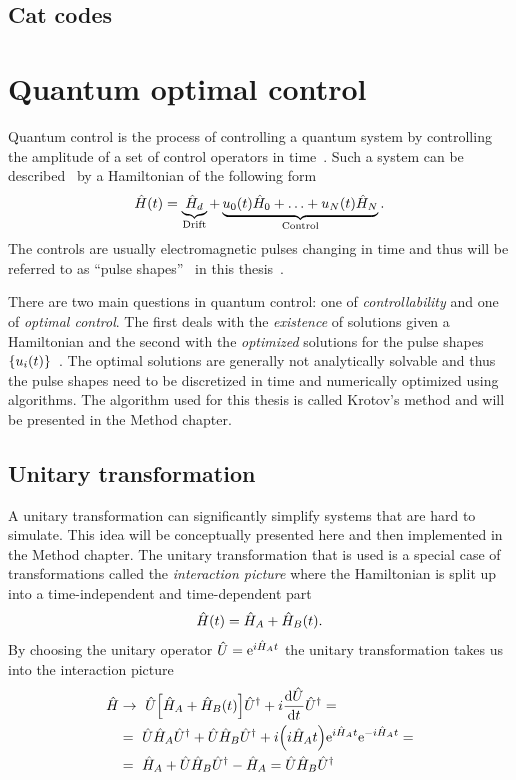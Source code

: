 \documentclass[main.tex]{subfiles}
\begin{document}
\subsection{Cat codes}


\section{Quantum optimal control}
Quantum control is the process of controlling a quantum system by controlling the amplitude of a set of control operators in time~\cite{fisher_optimal_2010}.
Such a system can be described~\cite{fisher_optimal_2010} by a Hamiltonian of the following form
\begin{equation}
    \hat{H}(t) = \underbrace{\hat{H}_d}_{\text{Drift}} + \underbrace{u_0(t)\hat{H}_0 + \dotsc + u_N(t)\hat{H}_N}_{\text{Control}}.
    \label{eq:optimal-control-hamiltonian}
\end{equation}
The controls are usually electromagnetic pulses changing in time and thus will be referred to as ``pulse shapes''~\cite{fisher_optimal_2010} in this thesis~.

There are two main questions in quantum control: one of \emph{controllability} and one of \emph{optimal control}.
The first deals with the \emph{existence} of solutions given a Hamiltonian and the second with the \emph{optimized} solutions for the pulse shapes \(\qty{u_i(t)}\)~\cite{dalessandro_introduction_2007}.
The optimal solutions are generally not analytically solvable and thus the pulse shapes need to be discretized in time and numerically optimized using algorithms.
The algorithm used for this thesis is called Krotov's method and will be presented in the Method chapter.

\subsection{Unitary transformation}
A unitary transformation can significantly simplify systems that are hard to simulate.
This idea will be conceptually presented here and then implemented in the Method chapter.
The unitary transformation that is used is a special case of transformations called the \emph{interaction picture} where the Hamiltonian is split up into a time-independent and time-dependent part
\begin{equation}
    \hat{H}(t) = \hat{H}_A + \hat{H}_B(t).
\end{equation}
By choosing the unitary operator \( \hat{U} = \mathrm{e}^{i \hat{H}_A t} \) the unitary transformation takes us into the interaction picture
\begin{align*}
    \hat{H} &\rightarrow~ \hat{U}\qty[ \hat{H}_A  + \hat{H}_B(t)]\hat{U}^\dagger + i\dv{\hat{U}}{t}\hat{U}^\dagger =\\
    &=~ \hat{U}\hat{H}_A\hat{U}^\dagger + \hat{U}\hat{H}_B\hat{U}^\dagger + i\qty(i\hat{H}_A t)\mathrm{e}^{i \hat{H}_A t}\mathrm{e}^{-i\hat{H}_A t}=\\
    &=~ \hat{H}_A + \hat{U}\hat{H}_B\hat{U}^\dagger - \hat{H}_A = \hat{U}\hat{H}_B\hat{U}^\dagger
\end{align*}
\end{document}
